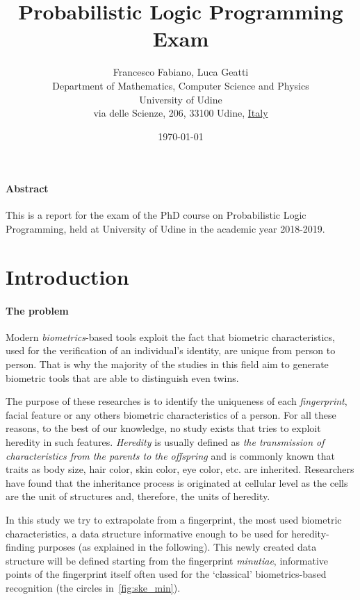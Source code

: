 \documentclass[8pt]{article}
\title{Probabilistic Logic Programming Exam}
\author{
        Francesco Fabiano, Luca Geatti\\
        \footnotesize Department of Mathematics, Computer Science and Physics \\
        \footnotesize University of Udine\\
        \footnotesize via delle Scienze, 206, 33100 Udine, \underline{Italy}
}
\date{\footnotesize\today}
\begin{document}
\maketitle
\paragraph{Abstract}
This is a report for the exam of the PhD course on Probabilistic Logic
Programming, held at University of Udine in the academic year 2018-2019.



\section{Introduction}

  \paragraph{The problem}
    Modern \textit{biometrics}-based tools exploit the fact that biometric characteristics, used for the verification of an individual’s identity, are unique from person to person.
    That is why the majority of the studies in this field aim to generate biometric tools that are able to distinguish even twins.
    
    The purpose of these researches is to identify the uniqueness of each \textit{fingerprint}, facial feature or any others biometric characteristics of a person.
    For all these reasons, to the best of our knowledge, no study exists that tries to exploit heredity in such features.
    \textit{Heredity} is usually defined as \textit{the transmission of characteristics from the parents to the offspring}
    and is commonly known that traits as body size, hair color, skin color, eye color, etc. are inherited.
    Researchers have found that the inheritance process is originated at cellular level as the cells are the unit of structures and, therefore, the units of heredity.
    
    In this study we try to extrapolate from a fingerprint, the most used biometric characteristics, a data structure informative enough to be used for heredity-finding purposes (as explained in the following).
    This newly created data structure will be defined starting from the
    fingerprint \textit{minutiae}, informative points of the fingerprint itself
    often used for the \textquoteleft classical' biometrics-based recognition
    (the circles in~\cref{fig:ske_min}).
\end{document}
